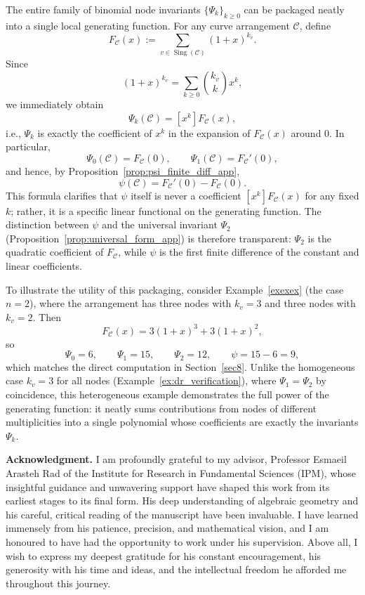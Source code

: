 \documentclass[article,11pt]{amsart} \numberwithin{equation}{section}
\numberwithin{equation}{section}
\begin{document}
{\begin{rk}
	\label{rmk:generating_function}
	The entire family of binomial node invariants $\{\Psi_k\}_{k\ge 0}$ can be packaged neatly into a single local generating function. For any curve arrangement $\mathcal C$, define
	\[
	F_{\mathcal C}(x) := \sum_{v\in\operatorname{Sing}(\mathcal C)} (1+x)^{k_v}.
	\]
	Since
	\[
	(1+x)^{k_v} = \sum_{k\ge 0} \binom{k_v}{k} x^k,
	\]
	we immediately obtain
	\[
	\Psi_k(\mathcal C) = [x^k] F_{\mathcal C}(x),
	\]
	i.e., $\Psi_k$ is exactly the coefficient of $x^k$ in the expansion of $F_{\mathcal C}(x)$ around $0$. In particular,
	\[
	\Psi_0(\mathcal C) = F_{\mathcal C}(0), \qquad
	\Psi_1(\mathcal C) = F_{\mathcal C}'(0),
	\]
	and hence, by Proposition~\ref{prop:psi_finite_diff_app},
	\[
	\psi(\mathcal C) = F_{\mathcal C}'(0) - F_{\mathcal C}(0).
	\]
	This formula clarifies that $\psi$ itself is never a coefficient $[x^k]F_{\mathcal C}(x)$ for any fixed $k$; rather, it is a specific linear functional on the generating function. The distinction between $\psi$ and the universal invariant $\Psi_2$ (Proposition~\ref{prop:universal_form_app}) is therefore transparent: $\Psi_2$ is the quadratic coefficient of $F_{\mathcal C}$, while $\psi$ is the first finite difference of the constant and linear coefficients.
	
	To illustrate the utility of this packaging, consider Example~\ref{exexex} (the case $n=2$), where the arrangement has three nodes with $k_v=3$ and three nodes with $k_v=2$. Then
	\[
	F_{\mathcal C}(x)=3(1+x)^3+3(1+x)^2,
	\]
	so
	\[
	\Psi_0=6,\qquad \Psi_1=15,\qquad \Psi_2=12,\qquad \psi=15-6=9,
	\]
	which matches the direct computation in Section~\ref{sec8}. Unlike the homogeneous case $k_v=3$ for all nodes (Example~\ref{ex:dr_verification}), where $\Psi_1=\Psi_2$ by coincidence, this heterogeneous example demonstrates the full power of the generating function: it neatly sums contributions from nodes of different multiplicities into a single polynomial whose coefficients are exactly the invariants $\Psi_k$.
\end{rk}




	

\noindent\textbf{Acknowledgment.} 
I am profoundly grateful to my advisor, Professor Esmaeil Arasteh Rad of the Institute for Research in Fundamental Sciences (IPM), whose insightful guidance and unwavering support have shaped this work from its earliest stages to its final form. His deep understanding of algebraic geometry and his careful, critical reading of the manuscript have been invaluable. I have learned immensely from his patience, precision, and mathematical vision, and I am honoured to have had the opportunity to work under his supervision. Above all, I wish to express my deepest gratitude for his constant encouragement, his generosity with his time and ideas, and the intellectual freedom he afforded me throughout this journey.

}
\end{document}
